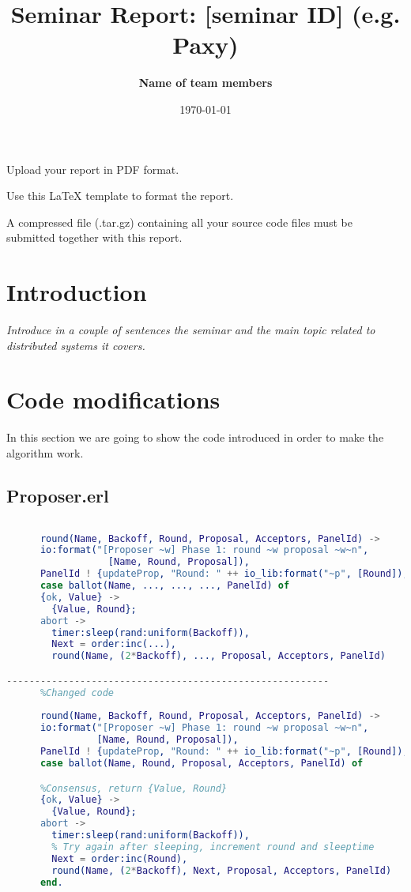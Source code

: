 \documentclass[a4paper, 10pt]{article}
\title{Seminar Report: [seminar ID] (e.g. Paxy)}
\author{\textbf{Name of team members}}
\date{\normalsize\today{}}
\begin{document}
\maketitle

\begin{center}
  Upload your report in PDF format.
  
  Use this LaTeX template to format the report.
  
	A compressed file (.tar.gz) containing all your source code files must be submitted together with this report.
\end{center}

\section{Introduction}

\textit{Introduce in a couple of sentences the seminar and the main topic related to distributed systems it covers.}

\section{Code modifications}

  In this section we are going to show the code introduced in order to make the algorithm work.

  \subsection{Proposer.erl}

    \begin{lstlisting}[language=erlang]
      %Provided code
      
      round(Name, Backoff, Round, Proposal, Acceptors, PanelId) ->
      io:format("[Proposer ~w] Phase 1: round ~w proposal ~w~n", 
                  [Name, Round, Proposal]),
      PanelId ! {updateProp, "Round: " ++ io_lib:format("~p", [Round]), Proposal},
      case ballot(Name, ..., ..., ..., PanelId) of  
      {ok, Value} ->
        {Value, Round};
      abort ->
        timer:sleep(rand:uniform(Backoff)),
        Next = order:inc(...),
        round(Name, (2*Backoff), ..., Proposal, Acceptors, PanelId)

---------------------------------------------------------
      %Changed code 
      
      round(Name, Backoff, Round, Proposal, Acceptors, PanelId) ->
      io:format("[Proposer ~w] Phase 1: round ~w proposal ~w~n", 
                [Name, Round, Proposal]),
      PanelId ! {updateProp, "Round: " ++ io_lib:format("~p", [Round]), Proposal},
      case ballot(Name, Round, Proposal, Acceptors, PanelId) of

      %Consensus, return {Value, Round}
      {ok, Value} ->
        {Value, Round};
      abort ->
        timer:sleep(rand:uniform(Backoff)),
        % Try again after sleeping, increment round and sleeptime
        Next = order:inc(Round),
        round(Name, (2*Backoff), Next, Proposal, Acceptors, PanelId)
      end.
    \end{lstlisting}
\end{document}
